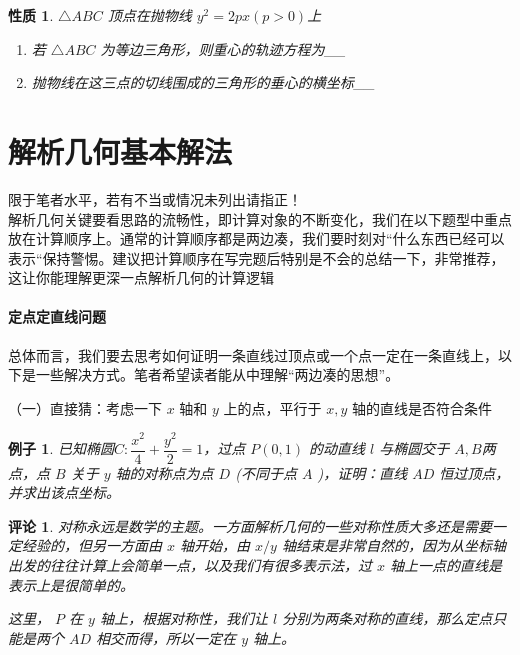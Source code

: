 \documentclass[a4paper,10pt,twoside]{article}
\newtheorem{example}{例子}[section]
\newtheorem{remark}{评论}
\newtheorem{proposition}{性质}
\begin{document}
\begin{proposition}
     $ \triangle ABC  $ 顶点在抛物线 $ y^2=2px(p>0) $上
     \begin{enumerate}
        \item 若 $ \triangle ABC  $ 为等边三角形，则重心的轨迹方程为\_\_
        \item 抛物线在这三点的切线围成的三角形的垂心的横坐标\_\_ 
     \end{enumerate}
\end{proposition}
\section{解析几何基本解法}
限于笔者水平，若有不当或情况未列出请指正！\\
解析几何关键要看思路的流畅性，即计算对象的不断变化，我们在以下题型中重点放在计算顺序上。通常的计算顺序都是两边凑，我们要时刻对“什么东西已经可以表示“保持警惕。建议把计算顺序在写完题后特别是不会的总结一下，非常推荐，这让你能理解更深一点解析几何的计算逻辑
\paragraph{定点定直线问题}总体而言，我们要去思考如何证明一条直线过顶点或一个点一定在一条直线上，以下是一些解决方式。笔者希望读者能从中理解“两边凑的思想”。

（一）直接猜：考虑一下 $ x  $ 轴和 $ y  $ 上的点，平行于 $  x,y $ 轴的直线是否符合条件
\begin{example}
    已知椭圆$ C:\dfrac{x^2}{4}+\dfrac{y^2}{2}=1 $，过点 $ P (0,1 ) $ 的动直线 $ l  $ 与椭圆交于 $ A,B  $两点，点 $ B  $ 关于 $ y  $ 轴的对称点为点 $ D  $ (不同于点 $ A $ )，证明：直线 $ AD  $ 恒过顶点，并求出该点坐标。 
\end{example}
\begin{remark}
    对称永远是数学的主题。一方面解析几何的一些对称性质大多还是需要一定经验的，但另一方面由 $ x  $ 轴开始，由 $ x/y  $ 轴结束是非常自然的，因为从坐标轴出发的往往计算上会简单一点，以及我们有很多表示法，过 $ x  $ 轴上一点的直线是表示上是很简单的。

    这里， $ P  $ 在 $ y  $ 轴上，根据对称性，我们让 $ l  $ 分别为两条对称的直线，那么定点只能是两个 $ AD  $ 相交而得，所以一定在 $ y  $ 轴上。
\end{remark}
\end{document}
